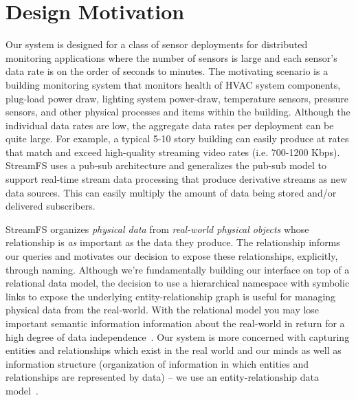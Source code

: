 \section{Design Motivation}
Our system is designed for a class of sensor deployments for distributed monitoring applications where the 
number of sensors is large and each sensor's data rate is on the order of seconds to minutes.  The motivating
scenario is a building monitoring system that monitors health of HVAC system components, plug-load power draw, 
lighting system power-draw, temperature sensors, pressure sensors, and other physical processes and items
within the building.  Although the individual data rates are low, the aggregate data rates per deployment
can be quite large.  For example, a typical 5-10 story building can easily produce at rates that match and exceed high-quality
streaming video rates (i.e. 700-1200 Kbps).  StreamFS uses a pub-sub architecture and generalizes the pub-sub
model to support real-time stream data processing that produce derivative streams as new data sources.  This can easily
multiply the amount of data being stored and/or delivered subscribers.

StreamFS organizes \emph{physical data} from \emph{real-world physical objects} whose relationship
is \emph{as} important as the data they produce.  The relationship informs our queries and motivates our decision to expose
these relationships, explicitly, through naming.  Although we're fundamentally building our interface on top of a relational
data model, the decision to use a hierarchical namespace with symbolic links to expose the underlying
entity-relationship graph is useful for managing physical data from the real-world.  With the relational model
you may lose important semantic information information about the real-world in return for a high degree
of data independence~\cite{Chen76theentity-relationship}.  Our system is more concerned with capturing
entities and relationships which exist in the real world and our minds as well as information structure (organization
of information in which entities and relationships are represented by data) -- we use an entity-relationship
data model~\cite{Chen76theentity-relationship}.



